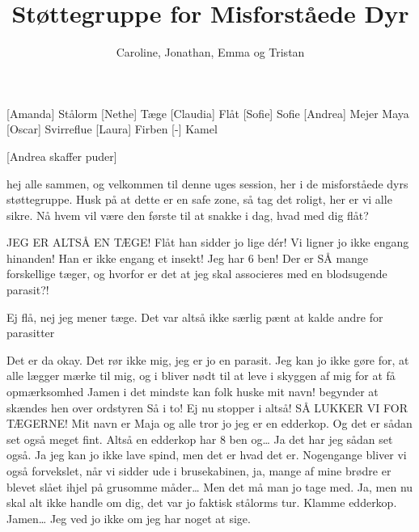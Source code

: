 \documentclass[a4paper,11pt]{article}
\title{Støttegruppe for Misforståede Dyr}
\author{Caroline, Jonathan, Emma og Tristan}
\begin{document}
\maketitle

\begin{roles}
    [Amanda] Stålorm
 [Nethe] Tæge
 [Claudia] Flåt
 [Sofie] Sofie
 [Andrea] Mejer Maya
 [Oscar] Svirreflue
 [Laura] Firben
 [-] Kamel
\end{roles}

\begin{props}
    [Andrea skaffer puder]
\end{props}

\begin{sketch}



 hej alle sammen, og velkommen til denne uges session, her i de misforståede dyrs støttegruppe. Husk på at dette er en safe zone, så tag det roligt, her er vi alle sikre. Nå hvem vil være den første til at snakke i dag, hvad med dig flåt?

 JEG ER ALTSÅ EN TÆGE! Flåt han sidder jo lige dér! Vi ligner jo ikke engang hinanden! Han er ikke engang et insekt! Jeg har 6 ben! Der er SÅ mange forskellige tæger, og hvorfor er det at jeg skal associeres med en blodsugende parasit?!

 Ej flå, nej jeg mener tæge. Det var altså ikke særlig pænt at kalde andre for parasitter 


 Det er da okay. Det rør ikke mig, jeg er jo en parasit. Jeg kan jo ikke gøre for, at alle lægger mærke til mig, og i bliver nødt til at leve i skyggen af mig for at få opmærksomhed
 Jamen i det mindste kan folk huske mit navn! 
 begynder at skændes hen over ordstyren  
 Så i to! Ej nu stopper i altså! SÅ LUKKER VI FOR TÆGERNE!
 Mit navn er Maja og alle tror jo jeg er en edderkop. Og det er sådan set også meget fint. Altså en edderkop har 8 ben og… Ja det har jeg sådan set også. Ja jeg kan jo ikke lave spind, men det er hvad det er. Nogengange bliver vi også forvekslet, når vi sidder ude i brusekabinen, ja, mange af mine brødre er blevet slået ihjel på grusomme måder… Men det må man jo tage med.
 Ja, men nu skal alt ikke handle om dig, det var jo faktisk stålorms tur. Klamme edderkop. 
 Jamen… Jeg ved jo ikke om jeg har noget at sige. 


\end{sketch}
\end{document}
